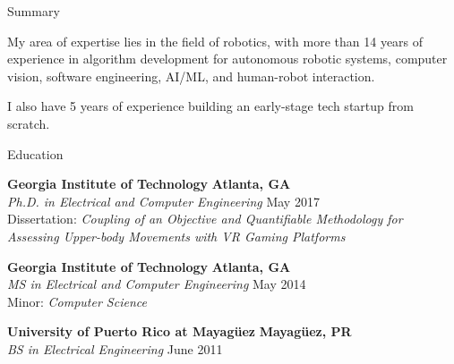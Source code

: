 \documentclass{resume} %
\newcommand{\sectionspace}{\vspace{3mm}}
\begin{document}
\begin{rSection}{Summary}

  My area of expertise lies in the field of robotics, with more than 14 years
  of experience in algorithm development for autonomous robotic systems,
  computer vision, software engineering, AI/ML, and human-robot interaction.

  I also have 5 years of experience building an early-stage tech startup from
  scratch.


\end{rSection}




\sectionspace
\begin{rSection}{Education}

{\bf Georgia Institute of Technology} \hfill {\bf Atlanta, GA} \\
\textit{Ph.D. in Electrical and Computer Engineering} \hfill May 2017 \\
Dissertation: \textit{Coupling of an Objective and Quantifiable Methodology for Assessing Upper-body Movements with VR Gaming Platforms}

{\bf Georgia Institute of Technology} \hfill {\bf Atlanta, GA} \\
\textit{MS in Electrical and Computer Engineering} \hfill May 2014 \\
Minor: \textit{Computer Science}

{\bf University of Puerto Rico at Mayag\"{u}ez} \hfill {\bf Mayag\"{u}ez, PR} \\
\textit{BS in Electrical Engineering} \hfill June 2011

\end{rSection}




\end{document}
